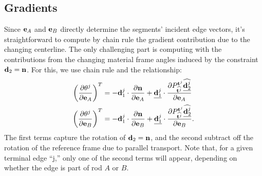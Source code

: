 \documentclass[10pt]{article}
\providecommand{\pder}[2]{\frac{\partial #1}{\partial #2}}
\renewcommand{\vec}[1]{{\bf #1}}
\def\normal{{\bf n}}
\def\n{\normal}
\def\d{\vec{d}}
\def\t{\vec{t}}
\def\e{\vec{e}}
\providecommand\ts[1]{\widehat{\vec{t}^{#1}}}
\providecommand\ds[2]{\widehat{\vec{d}^{#1}_{#2}}}
\providecommand{\PXport}[1]{P_{\ts{#1}}^{\t^{#1}}}
\begin{document}
\subsection{Gradients}
Since $\e_A$ and $\e_B$ directly determine the segments' incident edge vectors,
it's straightforward to compute by chain rule the gradient contribution due to
the changing centerline. The only challenging part is computing with the
contributions from the changing material frame angles induced by the constraint
$\d_2 = \n$. For this, we use chain rule and the relationship:
\begin{align*}
    \left(\pder{\theta^j}{\e_A}\right)^T &= -\d^j_1 \cdot \pder{\n}{\e_A} + \underline{\d^j_1} \cdot \pder{\PXport{j} \underline{\ds{j}{2}}}{\e_A} \\
    \left(\pder{\theta^j}{\e_B}\right)^T &= -\d^j_1 \cdot \pder{\n}{\e_B} + \underline{\d^j_1} \cdot \pder{\PXport{j} \underline{\ds{j}{2}}}{\e_B}.
\end{align*}
The first terms capture the rotation of $\d_2 = \bf{n}$, and the second subtract off the rotation of the reference frame due to parallel transport.
Note that, for a given terminal edge ``j,''  only one of the second terms will
appear, depending on whether the edge is part of rod $A$ or $B$.
\end{document}
